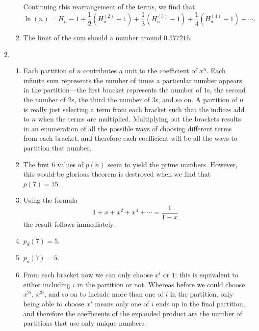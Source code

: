 \documentclass[a4paper,10pt]{article}
\begin{document}
\begin{enumerate}
\begin{enumerate}
          Continuing this rearrangement of the terms, we find that
          \[\ln(n)=H_n-1+\frac{1}{2}(H^{(2)}_n-1)+\frac{1}{3}(H^{(3)}_n-1)+\frac{1}{4}(H^{(4)}_n-1)+\cdots.\]
        \item The limit of the sum should a number around \(0.577216.\)
        \end{enumerate}
      \item
        \begin{enumerate}
        \item Each partition of \(n\) contributes a unit to the coefficient
          of \(x^n\). Each infinite sum represents the number of times a particular number appears in the partition---the first bracket represents the number
          of \(1\)s, the second the number of \(2\)s, the third the number
          of \(3\)s, and so on. A partition of \(n\) is really just selecting
          a term from each bracket such that the indices add to \(n\)
          when the terms are multiplied. Multiplying out the brackets
          results in an enumeration of all the possible ways of choosing
          different terms from each bracket, and therefore each coefficient
          will be all the ways to partition that number.
        \item The first \(6\) values of \(p(n)\) seem to yield the prime
          numbers. However, this would-be glorious theorem is destroyed
          when we find that \(p(7)=15\).
        \item Using the formula \[1+x+x^2+x^3+\cdots=\frac{1}{1-x}\] the result
          follows immediately.
        \item \(p_d(7)=5\).
        \item \(p_o(7)=5\).
        \item From each bracket now we can only choose \(x^i\) or \(1\); this is
          equivalent to either including \(i\) in the partition or not.
          Whereas before we could choose \(x^{2i}\), \(x^{3i}\), and so on to
          include more than one of \(i\) in the partition, only being
          able to choose \(x^i\) means only one of \(i\) ends up in the final
          partition, and therefore the coefficients of the expanded product
          are the number of partitions that use only unique numbers.


\end{enumerate}
\end{enumerate}
\end{document}

